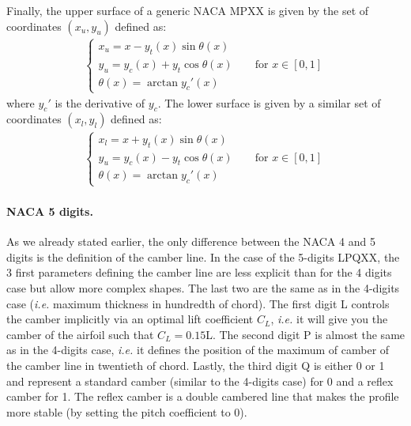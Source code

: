 \begin{subappendices}
	Finally, the upper surface of a generic NACA MPXX is given by the set of coordinates $(x_u, y_u)$ defined as:
	\begin{align}
		\begin{cases}
			x_u = x - y_t(x)\sin\theta(x) \\
			y_u = y_c(x) + y_t\cos\theta(x) \qquad \textrm{for } x\in [0,1]\\
			\theta(x) = \arctan y_c'(x)
		\end{cases}
	\end{align}
	where $y_c'$ is the derivative of $y_c$. The lower surface is given by a similar set of coordinates $(x_l, y_l)$ defined as:
	\begin{align}
		\begin{cases}
			x_l = x + y_t(x)\sin\theta(x) \\
			y_u = y_c(x) - y_t\cos\theta(x) \qquad \textrm{for } x\in [0,1]\\
			\theta(x) = \arctan y_c'(x)
		\end{cases}
	\end{align}
	
	\paragraph{NACA 5 digits.} As we already stated earlier, the only difference between the NACA 4 and 5 digits is the definition of the camber line. In the case of the 5-digits LPQXX, the 3 first parameters defining the camber line are less explicit than for the 4 digits case but allow more complex shapes. The last two are the same as in the 4-digits case (\emph{i.e.} maximum thickness in hundredth of chord). The first digit L controls the camber implicitly via an optimal lift coefficient $C_L$, \emph{i.e.} it will give you the camber of the airfoil such that $C_L = 0.15$L. The second digit P is almost the same as in the 4-digits case, \emph{i.e.} it defines the position of the maximum of camber of the camber line in twentieth of chord. Lastly, the third digit Q is either 0 or 1 and represent a standard camber (similar to the 4-digits case) for 0 and a reflex camber for 1. The reflex camber is a double cambered line that makes the profile more stable (by setting the pitch coefficient to 0).
	

\end{subappendices}
